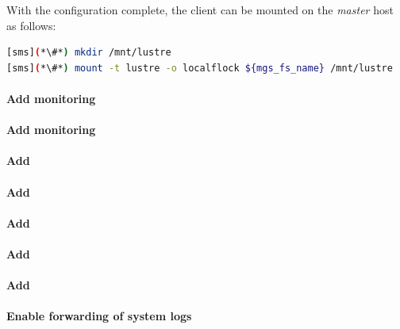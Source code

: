\documentclass[letterpaper]{article}
\begin{document}
With the \Lustre{} configuration complete, the client can be mounted on the {\em master}
host as follows:
\begin{lstlisting}[language=bash,keywords={},upquote=true]
[sms](*\#*) mkdir /mnt/lustre
[sms](*\#*) mount -t lustre -o localflock ${mgs_fs_name} /mnt/lustre
\end{lstlisting}


\paragraph{Add \Nagios{} monitoring}


\clearpage
\paragraph{Add \Ganglia{} monitoring}


\paragraph{Add \clustershell{}}


\paragraph{Add \mrsh{}}


\paragraph{Add \genders{}}


\paragraph{Add \powerman{}}


\paragraph{Add \conman{}} \label{sec:add_conman}


\paragraph{Enable forwarding of system logs} \label{sec:add_syslog}

\end{document}
